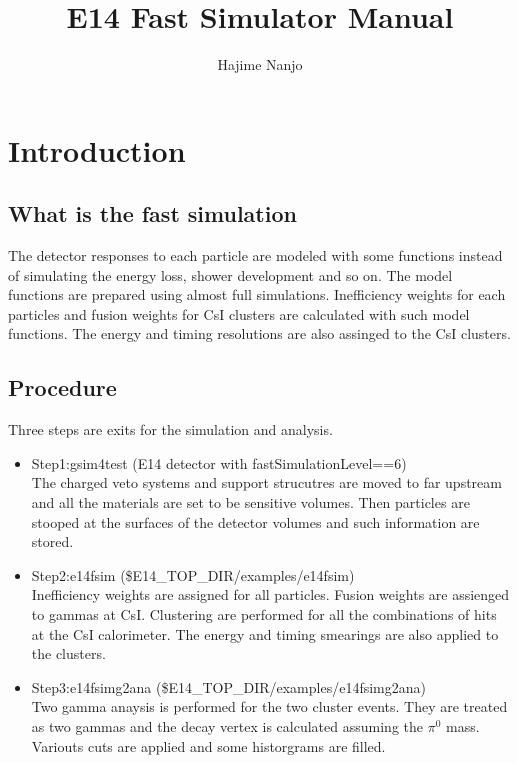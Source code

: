 \documentclass[a4paper,12pt]{article}
\begin{document}
\title{E14 Fast Simulator Manual}
\author{Hajime Nanjo}
\maketitle
 \section{Introduction}
  \subsection{What is the fast simulation}
  The detector responses to each particle are modeled with some 
  functions instead of simulating the energy loss, shower development and
  so on. The model functions are prepared using almost full
  simulations. Inefficiency weights for each particles and fusion
  weights for CsI clusters are calculated with such model functions. The
  energy and timing resolutions are also assinged to the CsI clusters.
  \subsection{Procedure}
  Three steps are exits for the simulation and analysis.
  \begin{itemize}
   \item Step1:gsim4test (E14 detector with fastSimulationLevel==6)\\
	 The charged veto systems and support strucutres are moved to far
	 upstream and all the materials are set to be sensitive
	 volumes. Then particles are stooped at the surfaces of the
	 detector volumes and such information are stored.
   \item Step2:e14fsim (\$E14\_TOP\_DIR/examples/e14fsim)\\
	 Inefficiency weights are assigned for all particles.
	 Fusion weights are assienged to gammas at CsI.
	 Clustering are performed for all the combinations of hits at
	 the CsI calorimeter. The energy and timing smearings are
	 also applied to the clusters.
   \item Step3:e14fsimg2ana (\$E14\_TOP\_DIR/examples/e14fsimg2ana)\\
	 Two gamma anaysis is performed for the two cluster events. They 
	 are treated as two gammas and the decay vertex is calculated
	 assuming the $\pi^0$ mass. Variouts cuts are applied and some
	 historgrams are filled.
  \end{itemize}
\end{document}

